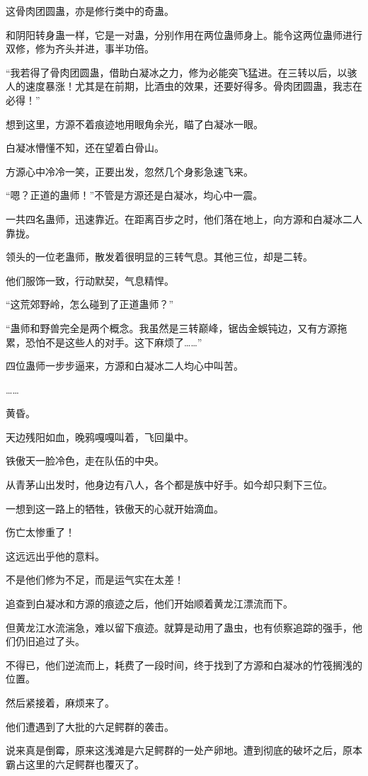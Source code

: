 \begin{this_body}
这骨肉团圆蛊，亦是修行类中的奇蛊。

和阴阳转身蛊一样，它是一对蛊，分别作用在两位蛊师身上。能令这两位蛊师进行双修，修为齐头并进，事半功倍。

“我若得了骨肉团圆蛊，借助白凝冰之力，修为必能突飞猛进。在三转以后，以骇人的速度暴涨！尤其是在前期，比酒虫的效果，还要好得多。骨肉团圆蛊，我志在必得！”

想到这里，方源不着痕迹地用眼角余光，瞄了白凝冰一眼。

白凝冰懵懂不知，还在望着白骨山。

方源心中冷冷一笑，正要出发，忽然几个身影急速飞来。

“嗯？正道的蛊师！”不管是方源还是白凝冰，均心中一震。

一共四名蛊师，迅速靠近。在距离百步之时，他们落在地上，向方源和白凝冰二人靠拢。

领头的一位老蛊师，散发着很明显的三转气息。其他三位，却是二转。

他们服饰一致，行动默契，气息精悍。

“这荒郊野岭，怎么碰到了正道蛊师？”

“蛊师和野兽完全是两个概念。我虽然是三转巅峰，锯齿金蜈钝边，又有方源拖累，恐怕不是这些人的对手。这下麻烦了……”

四位蛊师一步步逼来，方源和白凝冰二人均心中叫苦。

……

黄昏。

天边残阳如血，晚鸦嘎嘎叫着，飞回巢中。

铁傲天一脸冷色，走在队伍的中央。

从青茅山出发时，他身边有八人，各个都是族中好手。如今却只剩下三位。

一想到这一路上的牺牲，铁傲天的心就开始滴血。

伤亡太惨重了！

这远远出乎他的意料。

不是他们修为不足，而是运气实在太差！

追查到白凝冰和方源的痕迹之后，他们开始顺着黄龙江漂流而下。

但黄龙江水流湍急，难以留下痕迹。就算是动用了蛊虫，也有侦察追踪的强手，他们仍旧追过了头。

不得已，他们逆流而上，耗费了一段时间，终于找到了方源和白凝冰的竹筏搁浅的位置。

然后紧接着，麻烦来了。

他们遭遇到了大批的六足鳄群的袭击。

说来真是倒霉，原来这浅滩是六足鳄群的一处产卵地。遭到彻底的破坏之后，原本霸占这里的六足鳄群也覆灭了。


\end{this_body}
